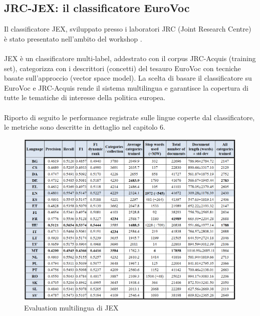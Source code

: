 \documentclass{article}
\theoremstyle{plain}
\theoremstyle{definition}
\begin{document}
\subsection{JRC-JEX: il classificatore EuroVoc}
Il classificatore JEX, sviluppato presso i laboratori JRC (Joint Research Centre) è stato presentato nell'ambito del workshop . 
\\
\\
JEX è un classificatore multi-label, addestrato con il corpus JRC-Acquis (training set), categorizza con i descrittori (concetti) del tesauro EuroVoc con tecniche basate sull'approccio  (vector space model).
La scelta di basare il classificatore su EuroVoc e JRC-Acquis rende il sistema multilingua e garantisce la copertura di tutte le tematiche di interesse della politica europea.
\\
\\
Riporto di seguito le performance registrate sulle lingue coperte dal classificatore, le metriche sono descritte in dettaglio nel capitolo 6.
\begin{figure}[htbp]
\begin{center}
\includegraphics[scale=0.70]{img/statjex.png}
\caption{Evaluation multilingua di JEX}
\end{center}
\end{figure}
\newpage
\end{document}
